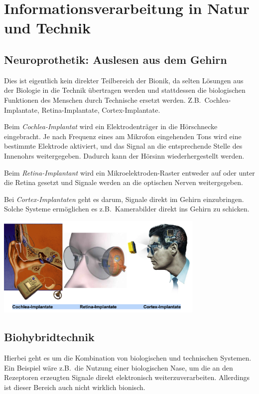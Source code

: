 \section{Informationsverarbeitung in Natur und Technik}

\subsection{Neuroprothetik: Auslesen aus dem Gehirn}

Dies ist eigentlich kein direkter Teilbereich der Bionik, da selten Lösungen aus der Biologie in die Technik übertragen werden und stattdessen die biologischen Funktionen des Menschen durch Technische ersetzt werden. Z.B.\ Cochlea-Implantate, Retina-Implantate, Cortex-Implantate.

Beim \textit{Cochlea-Implantat} wird ein Elektrodenträger in die Hörschnecke eingebracht. Je nach Frequenz eines am Mikrofon eingehenden Tons wird eine bestimmte Elektrode aktiviert, und das Signal an die entsprechende Stelle des Innenohrs weitergegeben. Dadurch kann der Hörsinn wiederhergestellt werden.

Beim \textit{Retina-Implantant} wird ein Mikroelektroden-Raster entweder auf oder unter die Retina gesetzt und Signale werden an die optischen Nerven weitergegeben.

Bei \textit{Cortex-Implantaten} geht es darum, Signale direkt im Gehirn einzubringen. Solche Systeme ermöglichen es z.B.\ Kamerabilder direkt ins Gehirn zu schicken.

\begin{center}
    \includegraphics[width=10cm]{lec8/figures/neuroprothetik.png}
\end{center}

\subsection{Biohybridtechnik}

Hierbei geht es um die Kombination von biologischen und technischen Systemen. Ein Beispiel wäre z.B.\ die Nutzung einer biologischen Nase, um die an den Rezeptoren erzeugten Signale direkt elektronisch weiterzuverarbeiten. Allerdings ist dieser Bereich auch nicht wirklich bionisch.


